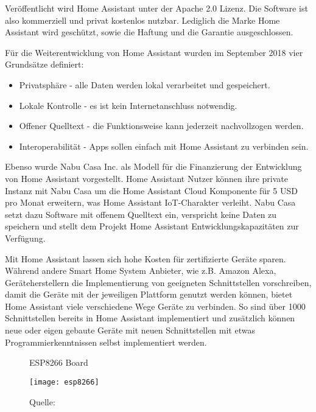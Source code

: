Veröffentlicht wird Home Assistant unter der Apache 2.0 Lizenz.
Die Software ist also kommerziell und privat kostenlos nutzbar.
Lediglich die Marke Home Assistant wird geschützt, sowie die Haftung und die Garantie ausgeschlossen.

Für die Weiterentwicklung von Home Assistant wurden im September 2018 vier Grundsätze definiert:

\begin{itemize}
	\item Privatsphäre - alle Daten werden lokal verarbeitet und gespeichert.
	\item Lokale Kontrolle - es ist kein Internetanschluss notwendig.
	\item Offener Quelltext - die Funktionsweise kann jederzeit nachvollzogen werden.
	\item Interoperabilität - Apps sollen einfach mit Home Assistant zu verbinden sein.
\end{itemize}

Ebenso wurde Nabu Casa Inc. als Modell für die Finanzierung der Entwicklung von Home Assistant vorgestellt.
Home Assistant Nutzer können ihre private Instanz mit Nabu Casa um die Home Assistant Cloud Komponente für 5 USD pro Monat erweitern, was Home Assistant \ac{IoT}-Charakter verleiht.
Nabu Casa setzt dazu Software mit offenem Quelltext ein, verspricht keine Daten zu speichern und stellt dem Projekt Home Assistant Entwicklungskapazitäten zur Verfügung.

Mit Home Assistant lassen sich hohe Kosten für zertifizierte Geräte sparen.
Während andere Smart Home System Anbieter, wie z.B. Amazon Alexa, Geräteherstellern die Implementierung von geeigneten Schnittstellen vorschreiben, damit die Geräte mit der jeweiligen Plattform genutzt werden können, bietet Home Assistant viele verschiedene Wege Geräte zu verbinden.
So sind über 1000 Schnittstellen bereits in Home Assistant implementiert und zusätzlich können neue oder eigen gebaute Geräte mit neuen Schnittstellen mit etwas Programmierkenntnissen selbst implementiert werden.

\begin{wrapfigure}{r}{0.4\textwidth}
	\centering
	\caption{ESP8266 Board}
	\texttt{[image: esp8266]}
	\caption*{\footnotesize{Quelle: }}
	\label{fig:esp8266}
\end{wrapfigure}


